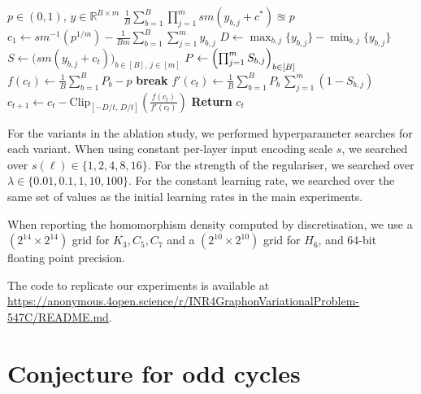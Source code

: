 \documentclass{article}
\theoremstyle{plain}
\theoremstyle{definition}
\theoremstyle{remark}
\newcommand*{\R}{\mathbb{R}}
\begin{document}
\begin{algorithm}
  \caption{Homomorphism-Density Constraint Solver}\label{alg:cap-hom}
  \begin{algorithmic}
    \REQUIRE $p \in (0,1)$, $y \in \R^{B \times m}$
    \ENSURE $\frac{1}{B} \sum_{b=1}^B \prod_{j=1}^m \mathit{sm}(y_{b,j} + c^*) \approxeq p$
    \STATE $c_1 \gets \mathit{sm}^{-1}(p^{1/m}) - \frac{1}{Bm} \sum_{b=1}^B \sum_{j=1}^m y_{b,j}$ \hfill {}
    \STATE $D \gets \max_{b,j}\{y_{b,j}\} - \min_{b,j}\{y_{b,j}\}$ \hfill {}
      \STATE $S \gets \bigl(\mathit{sm}(y_{b,j} + c_t)\bigr)_{b \in [B],\, j \in [m]}$
      \STATE $P \gets \Bigl(\prod_{j=1}^m S_{b,j}\Bigr)_{b \in [B]}$
      \STATE $f(c_t) \gets \frac{1}{B} \sum_{b=1}^B P_b - p$
        \STATE \textbf{break}
      \ENDIF
      \STATE $f'(c_t) \gets \frac{1}{B} \sum_{b=1}^B P_b\,\sum_{j=1}^m (1 - S_{b,j})$
      \STATE $c_{t+1} \gets c_t - \mathrm{Clip}_{[-D/t,\, D/t]}\left(\frac{f(c_t)}{f'(c_t)}\right)$
    \ENDFOR
    \STATE \textbf{Return} $c_t$
  \end{algorithmic}
\end{algorithm}

For the variants in the ablation study, we performed hyperparameter searches for each variant.
When using constant per-layer input encoding scale $s$, we searched over $s(\ell) \in \{1, 2, 4, 8, 16\}$.
For the strength of the regulariser, we searched over $\lambda \in \{0.01, 0.1, 1, 10, 100\}$.
For the constant learning rate, we searched over the same set of values as the initial learning rates in the main experiments.

When reporting the homomorphism density computed by discretisation, we use a $(2^{14} \times 2^{14})$ grid for $K_3, C_5, C_7$ and a $(2^{10} \times 2^{10})$ grid for $H_6$, and 64-bit floating point precision.

The code to replicate our experiments is available at \url{https://anonymous.4open.science/r/INR4GraphonVariationalProblem-547C/README.md}.

\section{Conjecture for odd cycles} \label{sec:oddcycleconjecture}
\end{document}
